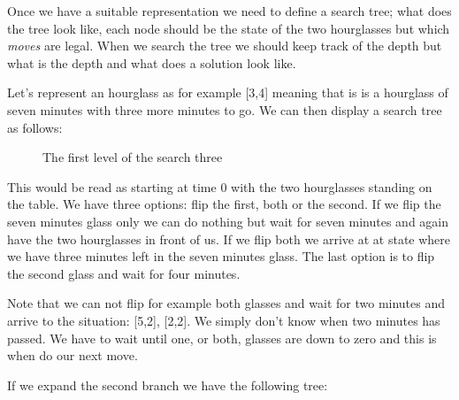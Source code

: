 \documentclass[a4paper,11pt]{article}
\begin{document}
Once we have a suitable representation we need to define a search
tree; what does the tree look like, each node should be the state of
the two hourglasses but which {\em moves} are legal. When we search
the tree we should keep track of the depth but what is the depth and
what does a solution look like.

Let's represent an hourglass as for example [3,4] meaning that is is a
hourglass of seven minutes with three more minutes to go. We can then
display a search tree as follows:

\begin{figure}[h]
\center
{}
\caption{The first level of the search three}
\end{figure}

This would be read as starting at time $0$ with the two hourglasses
standing on the table. We have three options: flip the first, both or
the second. If we flip the seven minutes glass only we can do nothing
but wait for seven minutes and again have the two hourglasses in front
of us. If we flip both we arrive at at state where we have three
minutes left in the seven minutes glass. The last option is to flip the second glass and wait for four minutes.

Note that we can not flip for example both glasses and wait for two
minutes and arrive to the situation: [5,2], [2,2]. We simply don't
know when two minutes has passed. We have to wait until one, or both,
glasses are down to zero and this is when do our next move.

If we expand the second branch we have the following tree:
\end{document}
